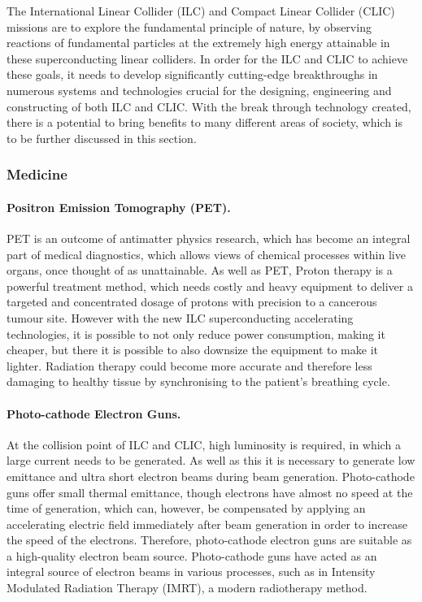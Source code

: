 The International Linear Collider (ILC) and Compact Linear Collider (CLIC) missions are to explore the fundamental principle of nature, by observing reactions of fundamental particles at the extremely high energy attainable in these superconducting linear colliders. In order for the ILC and CLIC to achieve these goals, it needs to develop significantly cutting-edge breakthroughs in numerous systems and technologies crucial for the designing, engineering and constructing of both ILC and CLIC. With the break through technology created, there is a potential to bring benefits to many different areas of society, which is to be further discussed in this section. \cite{ILC:SpinOffReport}

\subsubsection{Medicine}
 
\paragraph{Positron Emission Tomography (PET).}
 
PET is an outcome of antimatter physics research, which has become an integral part of medical diagnostics, which allows views of chemical processes within live organs, once thought of as unattainable. As well as PET, Proton therapy is a powerful treatment method, which needs costly and heavy equipment to deliver a targeted and concentrated dosage of protons with precision to a cancerous tumour site. However with the new ILC superconducting accelerating technologies, it is possible to not only reduce power consumption, making it cheaper, but there it is possible to also downsize the equipment to make it lighter. Radiation therapy could become more accurate and therefore less damaging to healthy tissue by synchronising to the patient's breathing cycle.
 
\paragraph{Photo-cathode Electron Guns.}

At the collision point of ILC and CLIC, high luminosity is required, in which a large current needs to be generated. As well as this it is necessary to generate low emittance and ultra short electron beams during beam generation. Photo-cathode guns offer small thermal emittance, though electrons have almost no speed at the time of generation, which can, however, be compensated by applying an accelerating electric field immediately after beam generation in order to increase the speed of the electrons. Therefore, photo-cathode electron guns are suitable as a high-quality electron beam source. Photo-cathode guns have acted as an integral source of electron beams in various processes, such as in Intensity Modulated Radiation Therapy (IMRT), a modern radiotherapy method.

